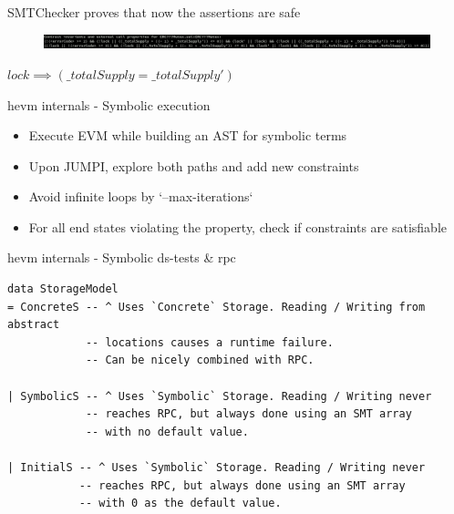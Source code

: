 \documentclass[aspectratio=169,10pt]{beamer}
\begin{document}
\begin{frame}[fragile]
\begin{center}
SMTChecker proves that now the assertions are safe
\begin{figure}
	\includegraphics[scale=0.23]{images/erc777_pass_smtchecker_invariants}
\end{figure}
$lock \implies (\_totalSupply = \_totalSupply')$
\end{center}
\end{frame}

\begin{frame}[fragile]
\begin{center}
hevm internals - Symbolic execution
\;\\
\begin{itemize}
\item Execute EVM while building an AST for symbolic terms
\item Upon JUMPI, explore both paths and add new constraints
\item Avoid infinite loops by `--max-iterations`
\item For all end states violating the property, check if constraints are satisfiable
\end{itemize}
\end{center}
\end{frame}

\begin{frame}[fragile]
\begin{center}
hevm internals - Symbolic ds-tests \& rpc
\;\\
{\small
\begin{verbatim}
data StorageModel
= ConcreteS -- ^ Uses `Concrete` Storage. Reading / Writing from abstract
            -- locations causes a runtime failure.
            -- Can be nicely combined with RPC.

| SymbolicS -- ^ Uses `Symbolic` Storage. Reading / Writing never
            -- reaches RPC, but always done using an SMT array
            -- with no default value.

| InitialS -- ^ Uses `Symbolic` Storage. Reading / Writing never
           -- reaches RPC, but always done using an SMT array
           -- with 0 as the default value.
\end{verbatim}
}%
\end{center}
\end{frame}
\end{document}
